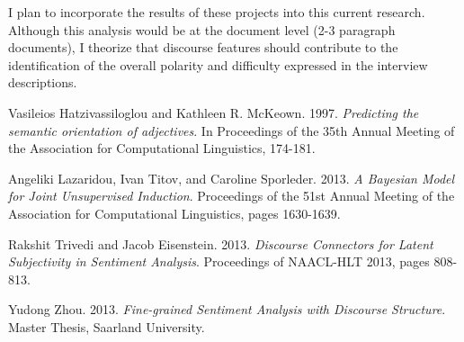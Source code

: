 \documentclass[12pt]{article}
\begin{document}
I plan to incorporate the results of these projects into this current research.  Although this analysis would be at the document level (2-3 paragraph documents), I theorize that discourse features should contribute to the identification of the overall polarity and difficulty expressed in the interview descriptions.

\begin{thebibliography}{}

Vasileios Hatzivassiloglou and Kathleen R. McKeown. 
1997. 
{\em Predicting the semantic orientation of adjectives}. 
 In Proceedings of the 35th Annual Meeting of the Association for Computational Linguistics, 174-181.

Angeliki Lazaridou, Ivan Titov, and Caroline Sporleder.
2013.
{\em A Bayesian Model for Joint Unsupervised Induction}.
Proceedings of the 51st Annual Meeting of the Association for Computational Linguistics, pages 1630-1639.

Rakshit Trivedi and Jacob Eisenstein.
2013.
{\em Discourse Connectors for Latent Subjectivity in Sentiment Analysis}.
Proceedings of NAACL-HLT 2013, pages 808-813.

Yudong Zhou.
2013.
{\em Fine-grained Sentiment Analysis with Discourse Structure}.
Master Thesis, Saarland University.

\end{thebibliography}
\end{document}
